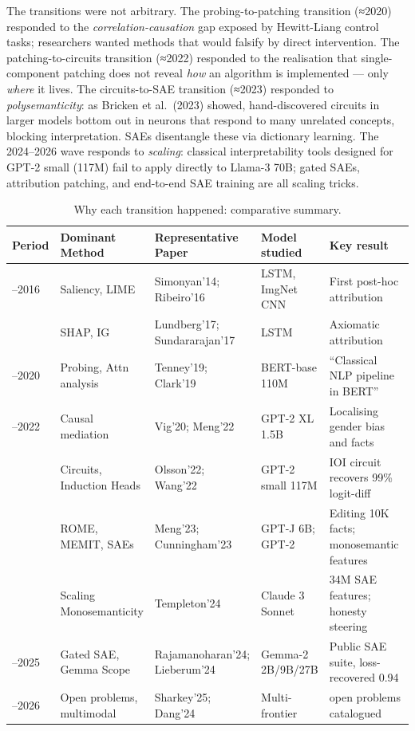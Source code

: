 \documentclass{article}
\begin{document}
The transitions were not arbitrary. The probing-to-patching transition (≈2020) responded to the \emph{correlation-causation} gap exposed by Hewitt-Liang control tasks; researchers wanted methods that would falsify by direct intervention. The patching-to-circuits transition (≈2022) responded to the realisation that single-component patching does not reveal \emph{how} an algorithm is implemented --- only \emph{where} it lives. The circuits-to-SAE transition (≈2023) responded to \emph{polysemanticity}: as Bricken et al.~(2023) showed, hand-discovered circuits in larger models bottom out in neurons that respond to many unrelated concepts, blocking interpretation. SAEs disentangle these via dictionary learning. The 2024--2026 wave responds to \emph{scaling}: classical interpretability tools designed for GPT-2 small (117M) fail to apply directly to Llama-3 70B; gated SAEs, attribution patching, and end-to-end SAE training \citep{braun2024identifyingfunctio} are all scaling tricks.

\begin{table}[t]
\centering
\caption{Why each transition happened: comparative summary.}
\label{tab:why-each-transition-happened}
\begin{tabular}{>{\raggedright\arraybackslash}p{0.0750\linewidth}
  >{\raggedright\arraybackslash}p{0.2083\linewidth}
  >{\raggedright\arraybackslash}p{0.2417\linewidth}
  >{\raggedright\arraybackslash}p{0.1417\linewidth}
  >{\raggedright\arraybackslash}p{0.3333\linewidth}}
\toprule
Period & Dominant Method & Representative Paper & Model studied & Key result \\
\midrule
2014--2016 & Saliency, LIME & Simonyan'14; Ribeiro'16 & LSTM, ImgNet CNN & First post-hoc attribution \\
2017 & SHAP, IG & Lundberg'17; Sundararajan'17 & LSTM & Axiomatic attribution \\
2018--2020 & Probing, Attn analysis & Tenney'19; Clark'19 & BERT-base 110M & ``Classical NLP pipeline in BERT'' \\
2020--2022 & Causal mediation & Vig'20; Meng'22 & GPT-2 XL 1.5B & Localising gender bias and facts \\
2022 & Circuits, Induction Heads & Olsson'22; Wang'22 & GPT-2 small 117M & IOI circuit recovers 99\% logit-diff \\
2023 & ROME, MEMIT, SAEs & Meng'23; Cunningham'23 & GPT-J 6B; GPT-2 & Editing 10K facts; monosemantic features \\
2024 & Scaling Monosemanticity & Templeton'24 & Claude 3 Sonnet & 34M SAE features; honesty steering \\
2024--2025 & Gated SAE, Gemma Scope & Rajamanoharan'24; Lieberum'24 & Gemma-2 2B/9B/27B & Public SAE suite, loss-recovered 0.94 \\
2025--2026 & Open problems, multimodal & Sharkey'25; Dang'24 & Multi-frontier & 35 open problems catalogued \\
\end{tabular}
\end{table}
\end{document}
